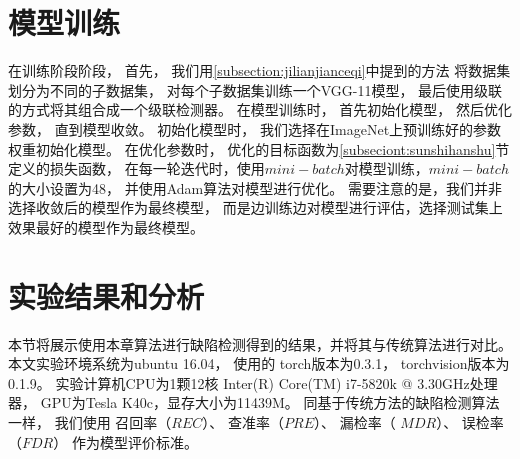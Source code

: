 \section{模型训练}

在训练阶段阶段，
首先，
我们用\ref{subsection:jilianjianceqi}中提到的方法
将数据集划分为不同的子数据集，
对每个子数据集训练一个VGG-11模型，
最后使用级联的方式将其组合成一个级联检测器。
在模型训练时，
首先初始化模型，
然后优化参数，
直到模型收敛。
初始化模型时，
我们选择在ImageNet上预训练好的参数权重初始化模型。
在优化参数时，
优化的目标函数为\ref{subseciont:sunshihanshu}节定义的损失函数，
在每一轮迭代时，使用$mini-batch$对模型训练，$mini-batch$的大小设置为48，
并使用Adam算法对模型进行优化。
需要注意的是，我们并非选择收敛后的模型作为最终模型，
而是边训练边对模型进行评估，选择测试集上效果最好的模型作为最终模型。


\section{实验结果和分析}

本节将展示使用本章算法进行缺陷检测得到的结果，并将其与传统算法进行对比。
本文实验环境系统为ubuntu 16.04，
使用的
torch版本为0.3.1，
torchvision版本为0.1.9。
实验计算机CPU为1颗12核 Inter(R) Core(TM) i7-5820k @ 3.30GHz处理器，
GPU为Tesla K40c，显存大小为11439M。
同基于传统方法的缺陷检测算法一样，
我们使用
召回率（$REC$）、
查准率（$PRE$）、
漏检率（ $MDR$）、
误检率（$FDR$）
作为模型评价标准。


